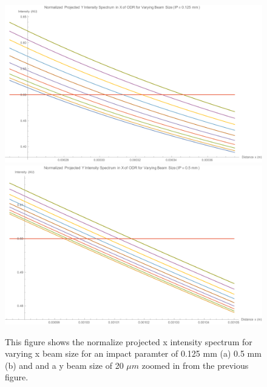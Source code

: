 \documentclass[12pt]{article}
\begin{document}
\begin{figure}
\begin{center}
\includegraphics[scale=0.5]{figures/ODR_Norm_ProjY_IntensityX_125_zoom.PDF}
\includegraphics[scale=0.5]{figures/ODR_Norm_ProjY_IntensityX_500_zoom.PDF}
\caption{This figure shows the normalize projected x intensity spectrum for varying x beam size for an impact paramter of 0.125 mm (a) 0.5 mm (b) and and a y beam size of 20 $\mu m$ zoomed in from the previous figure.}
\end{center}
\end{figure}
\end{document}
